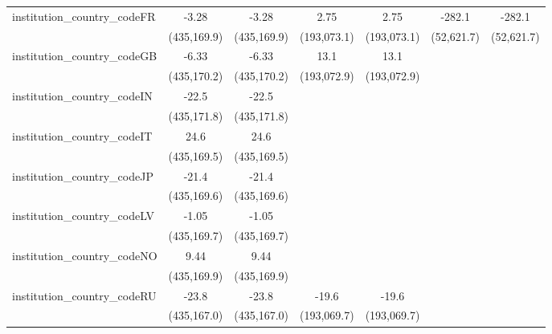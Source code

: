 \begin{tabular}{lcccccc}
   institution\_country\_codeFR          & -3.28         & -3.28         & 2.75          & 2.75          & -282.1      & -282.1\\   
                                         & (435,169.9)   & (435,169.9)   & (193,073.1)   & (193,073.1)   & (52,621.7)  & (52,621.7)\\   
   institution\_country\_codeGB          & -6.33         & -6.33         & 13.1          & 13.1          &             &   \\   
                                         & (435,170.2)   & (435,170.2)   & (193,072.9)   & (193,072.9)   &             &   \\   
   institution\_country\_codeIN          & -22.5         & -22.5         &               &               &             &   \\   
                                         & (435,171.8)   & (435,171.8)   &               &               &             &   \\   
   institution\_country\_codeIT          & 24.6          & 24.6          &               &               &             &   \\   
                                         & (435,169.5)   & (435,169.5)   &               &               &             &   \\   
   institution\_country\_codeJP          & -21.4         & -21.4         &               &               &             &   \\   
                                         & (435,169.6)   & (435,169.6)   &               &               &             &   \\   
   institution\_country\_codeLV          & -1.05         & -1.05         &               &               &             &   \\   
                                         & (435,169.7)   & (435,169.7)   &               &               &             &   \\   
   institution\_country\_codeNO          & 9.44          & 9.44          &               &               &             &   \\   
                                         & (435,169.9)   & (435,169.9)   &               &               &             &   \\   
   institution\_country\_codeRU          & -23.8         & -23.8         & -19.6         & -19.6         &             &   \\   
                                         & (435,167.0)   & (435,167.0)   & (193,069.7)   & (193,069.7)   &             &   \\   

\end{tabular}
